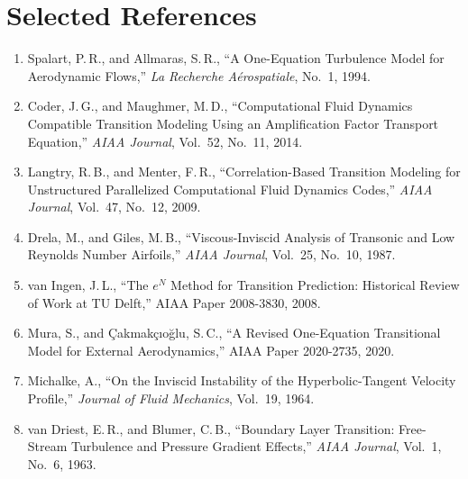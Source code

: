 \documentclass[11pt]{article}
\begin{document}
\section*{Selected References}
\small
\begin{enumerate}\setlength{\itemsep}{0pt}
\item Spalart, P.\,R., and Allmaras, S.\,R., ``A One-Equation Turbulence Model
for Aerodynamic Flows,'' \textit{La Recherche A\'{e}rospatiale}, No.~1, 1994.
\item Coder, J.\,G., and Maughmer, M.\,D., ``Computational Fluid Dynamics
Compatible Transition Modeling Using an Amplification Factor Transport
Equation,'' \textit{AIAA Journal}, Vol.~52, No.~11, 2014.
\item Langtry, R.\,B., and Menter, F.\,R., ``Correlation-Based Transition
Modeling for Unstructured Parallelized Computational Fluid Dynamics Codes,''
\textit{AIAA Journal}, Vol.~47, No.~12, 2009.
\item Drela, M., and Giles, M.\,B., ``Viscous-Inviscid Analysis of Transonic
and Low Reynolds Number Airfoils,'' \textit{AIAA Journal}, Vol.~25, No.~10,
1987.
\item van Ingen, J.\,L., ``The $e^N$ Method for Transition Prediction:
Historical Review of Work at TU Delft,'' AIAA Paper 2008-3830, 2008.
\item Mura, S., and \c{C}akmak\c{c}{\i}o\u{g}lu, S.\,C., ``A Revised
One-Equation Transitional Model for External Aerodynamics,'' AIAA Paper
2020-2735, 2020.
\item Michalke, A., ``On the Inviscid Instability of the Hyperbolic-Tangent
Velocity Profile,'' \textit{Journal of Fluid Mechanics}, Vol.~19, 1964.
\item van Driest, E.\,R., and Blumer, C.\,B., ``Boundary Layer Transition:
Free-Stream Turbulence and Pressure Gradient Effects,'' \textit{AIAA Journal},
Vol.~1, No.~6, 1963.
\end{enumerate}
\end{document}
